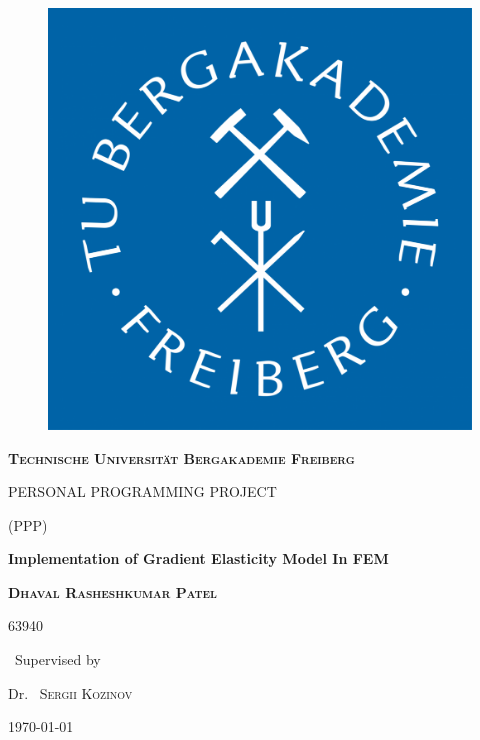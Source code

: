 \documentclass[12pt]{article}
\begin{document}
	\begin{titlepage}
		\centering
		
		\begin{figure}
			\begin{center}
				\includegraphics[scale=.2]{tubaf.pdf}  
			\end{center}
			
		\end{figure}
		
		
		
		{\scshape \LARGE \textbf{Technische Universit\"at Bergakademie Freiberg} \par}
		\vspace{1cm}
		{\scshape\Large PERSONAL PROGRAMMING PROJECT\par}
		{\scshape\Large (PPP)\par}
		\vspace{1.5cm}
		{\huge\bfseries Implementation of Gradient Elasticity Model In FEM \par}
		\vspace{2cm}
		{\scshape\Large \textbf{Dhaval Rasheshkumar Patel}\par}
		{\scshape\Large 63940\par}
		\vfill
		{\normalsize\ Supervised by\par}
		
		Dr.~ \textsc{Sergii Kozinov}
		
		\vfill
		
		{\large \today\par}
	\end{titlepage}
\end{document}
